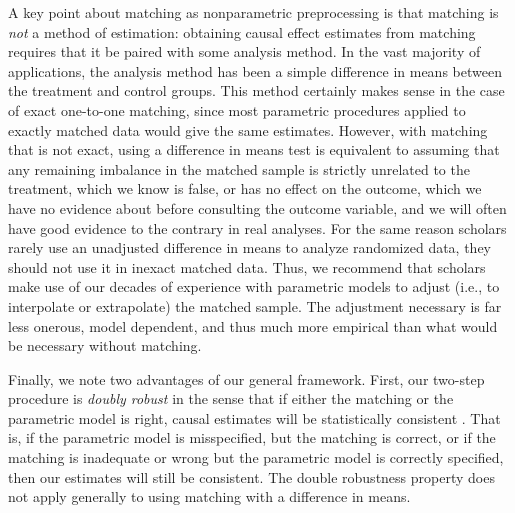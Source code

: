 \documentclass[11pt,titlepage]{article}
\begin{document}
A key point about matching as nonparametric preprocessing is that
matching is \emph{not} a method of estimation: obtaining causal effect
estimates from matching requires that it be paired with some analysis
method.  In the vast majority of applications, the analysis method has
been a simple difference in means between the treatment and control
groups.  This method certainly makes sense in the case of exact
one-to-one matching, since most parametric procedures applied to
exactly matched data would give the same estimates.  However, with
matching that is not exact, using a difference in means test is
equivalent to assuming that any remaining imbalance in the matched
sample is strictly unrelated to the treatment, which we know is false,
or has no effect on the outcome, which we have no evidence about
before consulting the outcome variable, and we will often have good
evidence to the contrary in real analyses.  For the same reason
scholars rarely use an unadjusted difference in means to analyze
randomized data, they should not use it in inexact matched data.
Thus, we recommend that scholars make use of our decades of experience
with parametric models to adjust (i.e., to interpolate or extrapolate)
the matched sample.  The adjustment necessary is far less onerous,
model dependent, and thus much more empirical than what would be
necessary without matching.

Finally, we note two advantages of our general framework. First, our
two-step procedure is \emph{doubly robust} in the sense that if either
the matching or the parametric model is right, causal estimates will
be statistically consistent \citep[see][]{RobRot01}.  That is, if the
parametric model is misspecified, but the matching is correct, or if
the matching is inadequate or wrong but the parametric model is
correctly specified, then our estimates will still be consistent.  The
double robustness property does not apply generally to using matching
with a difference in means.  
\end{document}

